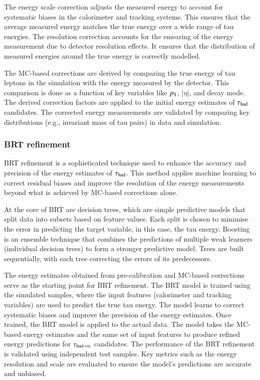         The energy scale correction adjusts the measured energy to account for systematic biases in the 
        calorimeter and tracking systems. This ensures that the average measured energy matches the true 
        energy over a wide range of tau energies. The resolution correction accounts for the smearing of 
        the energy measurement due to detector resolution effects. It ensures that the distribution of 
        measured energies around the true energy is correctly modelled.
        
        The MC-based corrections are derived by comparing the true energy of tau leptons in the simulation
        with the energy measured by the detector. This comparison is done as a function of key variables
        like $p_{\text{T}}$, $|\eta|$, and decay mode. The derived correction factors are applied to the initial 
        energy estimates of $\tau_{\text{had}}$ candidates. The corrected energy measurements are validated 
        by comparing key distributions (e.g., invariant mass of tau pairs) in data and simulation.

    \subsubsection{BRT refinement}
        BRT refinement is a sophisticated technique used to enhance the accuracy and precision of the 
        energy estimates of $\tau_{\text{had}}$. This method applies machine learning to correct residual 
        biases and improve the resolution of the energy measurements beyond what is achieved by MC-based 
        corrections alone.

        At the core of BRT are decision trees, which are simple predictive models that split data into 
        subsets based on feature values. Each split is chosen to minimise the error in predicting the 
        target variable, in this case, the tau energy. Boosting is an ensemble technique that combines 
        the predictions of multiple weak learners (individual decision trees) to form a stronger predictive 
        model. Trees are built sequentially, with each tree correcting the errors of its predecessors.
    
        The energy estimates obtained from pre-calibration and MC-based corrections
        serve as the starting point for BRT refinement. The BRT model is trained using the simulated 
        samples, where the input features (calorimeter and tracking variables) are used to predict 
        the true tau energy. The model learns to correct systematic biases and improve the precision 
        of the energy estimates. Once trained, the BRT model is applied to the actual data. The model 
        takes the MC-based energy estimates and the same set of input features to produce refined 
        energy predictions for $\tau_{\text{had-vis}}$ candidates. The performance of the BRT refinement 
        is validated using independent test samples. Key metrics such as the energy resolution and 
        scale are evaluated to ensure the model's predictions are accurate and unbiased.

